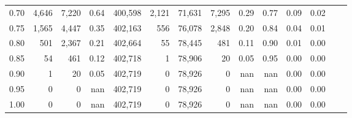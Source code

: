\begin{tabular}{rrrrrrrrrrrrrr}
0.70 &   4,646 &   7,220 &     0.64 &  400,598 &    2,121 &  71,631 &   7,295 &  0.29 &  0.77 &  0.09 &      0.02 \\
0.75 &   1,565 &   4,447 &     0.35 &  402,163 &      556 &  76,078 &   2,848 &  0.20 &  0.84 &  0.04 &      0.01 \\
0.80 &     501 &   2,367 &     0.21 &  402,664 &       55 &  78,445 &     481 &  0.11 &  0.90 &  0.01 &      0.00 \\
0.85 &      54 &     461 &     0.12 &  402,718 &        1 &  78,906 &      20 &  0.05 &  0.95 &  0.00 &      0.00 \\
0.90 &       1 &      20 &     0.05 &  402,719 &        0 &  78,926 &       0 &   nan &   nan &  0.00 &      0.00 \\
0.95 &       0 &       0 &      nan &  402,719 &        0 &  78,926 &       0 &   nan &   nan &  0.00 &      0.00 \\
1.00 &       0 &       0 &      nan &  402,719 &        0 &  78,926 &       0 &   nan &   nan &  0.00 &      0.00 \\
\bottomrule
\end{tabular}
